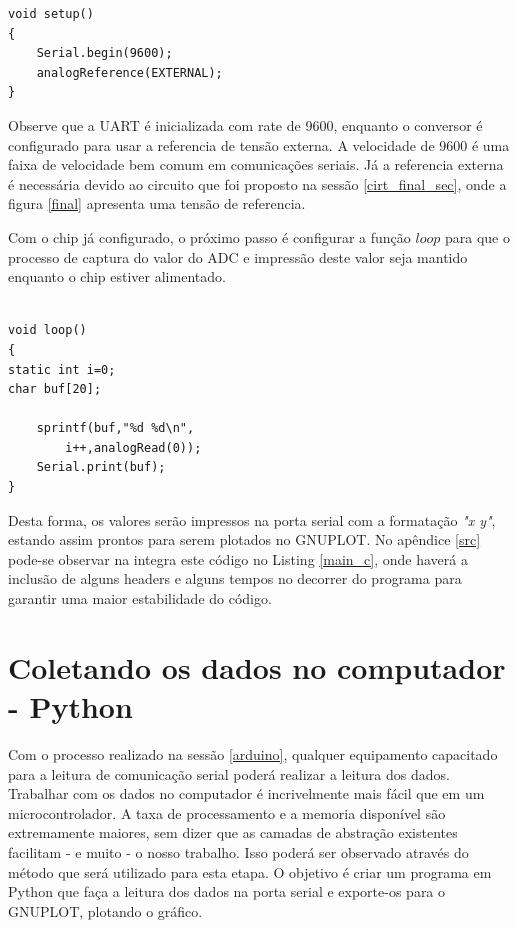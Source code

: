 \begin{multicols}{2}
\begin{lstlisting}[basicstyle=\ttfamily,numbers=none,caption={[setup()]Código da função setup()}]
void setup()
{
	Serial.begin(9600);
	analogReference(EXTERNAL);
}

\end{lstlisting}

Observe que a UART é inicializada com rate de 9600, enquanto o conversor é configurado para usar a referencia de tensão externa. A velocidade de 9600 é uma faixa de velocidade bem comum em comunicações seriais. Já a referencia externa é necessária devido ao circuito que foi proposto na sessão \ref{cirt_final_sec}, onde a figura \ref{final} apresenta uma tensão de referencia.

Com o chip já configurado, o próximo passo é configurar a função $loop$ para que o processo de captura do valor do ADC e impressão deste valor seja mantido enquanto o chip estiver alimentado.



\begin{lstlisting}[basicstyle=\ttfamily,numbers=none,caption={[loop()]Código da função loop()}]

void loop()
{
static int i=0;
char buf[20];

	sprintf(buf,"%d %d\n",
		i++,analogRead(0));
	Serial.print(buf);
}
\end{lstlisting}

Desta forma, os valores serão impressos na porta serial com a formatação \textit{"x y"}, estando assim prontos para serem plotados no GNUPLOT. No apêndice \ref{src} pode-se observar na integra este código no Listing
\ref{main_c}, onde haverá a inclusão de alguns headers e alguns tempos no decorrer do programa para garantir uma maior estabilidade do código.



\section{Coletando os dados no computador - Python}\label{python}

Com o processo realizado na sessão \ref{arduino}, qualquer equipamento capacitado para a leitura de comunicação serial poderá realizar a leitura dos dados. Trabalhar com os dados no computador é incrivelmente mais fácil que em um microcontrolador. A taxa de processamento e a memoria disponível são extremamente maiores, sem dizer que as camadas de abstração existentes facilitam - e muito - o nosso trabalho. Isso poderá ser observado através do método que será utilizado para esta etapa. O objetivo é criar um programa em Python que faça a leitura dos dados na porta serial e exporte-os para o GNUPLOT, plotando o gráfico.


\end{multicols}
